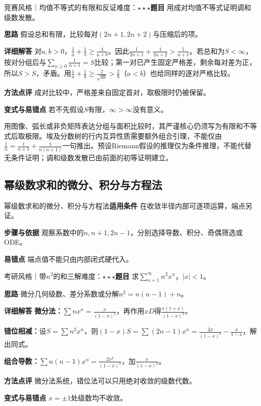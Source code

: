 \begin{example}{竞赛风格｜均值不等式的有限和反证}{难度：$\star\star\star$}\label{deep:ex:series_source_deep:means}\textbf{题目} 用成对均值不等式证明调和级数发散。\par\textbf{思路} 假设总和有限，比较每对$(2n+1,2n+2)$与压缩后的项。\par\textbf{详细解答} 对$a,b>0$，$\frac{1}{a}+\frac{1}{b}\ge\frac{4}{a+b}$。因此$\frac{1}{2n+1}+\frac{1}{2n+2}>\frac{1}{n+1}$。若总和为$S<\infty$，按对分组后与$\sum_{n\ge0}\frac{1}{n+1}=S$比较；第一对已产生固定严格差，剩余每对差为正，所以$S>S$，矛盾。用$\frac{1}{a}+\frac{1}{b}\ge\frac{2}{\sqrt{ab}}>\frac{2}{b}$（$a<b$）也给同样的逐对严格比较。\par\textbf{方法点评} 成对比较中，严格差来自固定首对，取极限时仍被保留。\par\textbf{变式与易错点} 若不先假设$S$有限，$\infty>\infty$没有意义。\end{example}

\begin{warning}用图像、弧长或非负矩阵表达分组与面积比较时，其严谨核心仍须写为有限和不等式后取极限。埃及分数树的行内互异性质需要额外组合引理，不能仅由$\frac{1}{n}=\frac{1}{n+1}+\frac{1}{n(n+1)}$一句推出。预设Riemann假设的推理仅为条件推理，不能代替无条件证明；调和级数发散已由前面的初等证明建立。\end{warning}

\subsection{幂级数求和的微分、积分与方程法}\label{deep:series_source_deep:summing}

\begin{method}{幂级数求和的微分、积分与方程法}\textbf{适用条件} 在收敛半径内部可逐项运算，端点另证。\par\textbf{步骤与依据} 观察系数中的$n,n+1,2n-1$，分别选择导数、积分、奇偶筛选或ODE。\par\textbf{易错点} 端点值不能只由内部闭式硬代入。\end{method}

\begin{example}{考研风格｜带$n^2$的和三解}{难度：$\star\star\star$}\label{deep:ex:series_source_deep:nsquare}\textbf{题目} 求$\sum_{n=1}^\infty n^2x^n$，$|x|<1$。\par\textbf{思路} 微分几何级数、差分系数或分解$n^2=n(n-1)+n$。\par\textbf{详细解答} \textbf{微分法：}$\sum nx^n=\frac{x}{(1-x)^2}$，再作用$xD$得$\frac{x(1+x)}{(1-x)^3}$。\par\textbf{错位相减：}设$S=\sum n^2x^n$，则$(1-x)S=\sum(2n-1)x^n=\frac{2x}{(1-x)^2}-\frac{x}{1-x}$，解出同式。\par\textbf{组合导数：}$\sum n(n-1)x^n=\frac{2x^2}{(1-x)^3}$，加$\frac{x}{(1-x)^2}$。\par\textbf{方法点评} 微分法系统，错位法可以只用绝对收敛的级数代数。\par\textbf{变式与易错点} $x=\pm1$处级数均不收敛。\end{example}

